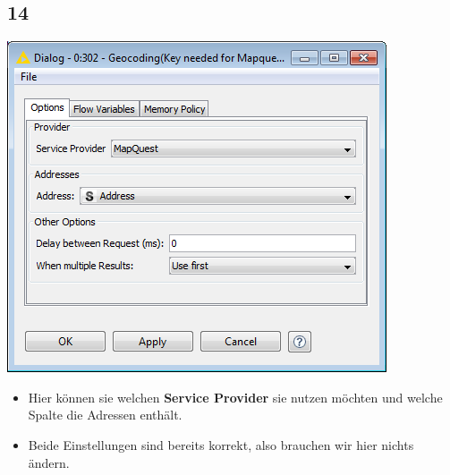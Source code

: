 \documentclass{beamer}
\begin{document}
\subsection{14}
\begin{frame}
	\begin{center}
  		\includegraphics[height=0.6\textheight]{14.png}
	\end{center}
	\begin{itemize}
		\item Hier können sie welchen \textbf{Service Provider} sie nutzen möchten und welche Spalte die Adressen enthält.
		\item Beide Einstellungen sind bereits korrekt, also brauchen wir hier nichts ändern.
	\end{itemize}
\end{frame}
\end{document}

